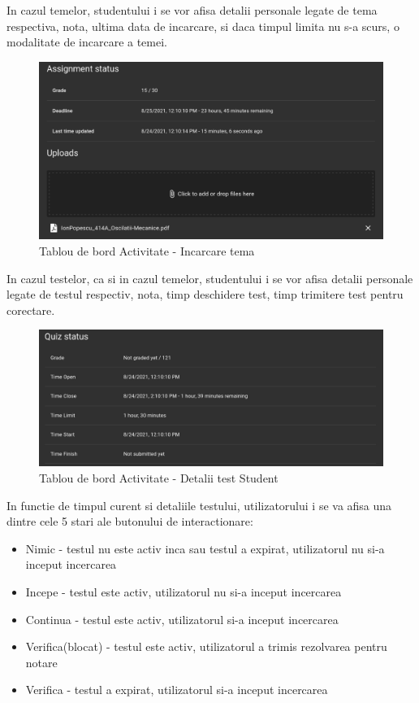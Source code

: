 \documentclass[12pt, a4paper, oneside, romanian]{teza-upb}
\begin{document}
In cazul temelor, studentului i se vor afisa detalii personale legate de tema respectiva, nota, ultima data de incarcare, si daca timpul limita nu s-a scurs, o modalitate de incarcare a temei.

\begin{figure}[H]
\centering
\includegraphics*[width=\columnwidth]{tablou-de-bord-activitate-incarcare-tema}
\caption{Tablou de bord Activitate - Incarcare tema}
\label{tablou-de-bord-activitate-incarcare-tema}
\end{figure}

In cazul testelor, ca si in cazul temelor, studentului i se vor afisa detalii personale legate de testul respectiv, nota, timp deschidere test, timp trimitere test pentru corectare.

\begin{figure}[H]
\centering
\includegraphics*[width=\columnwidth]{tablou-de-bord-activitate-detalii-test-student}
\caption{Tablou de bord Activitate - Detalii test Student}
\label{tablou-de-bord-activitate-detalii-test-student}
\end{figure}

In functie de timpul curent si detaliile testului, utilizatorului i se va afisa una dintre cele 5 stari ale butonului de interactionare:
\begin{itemize}
	\item Nimic - testul nu este activ inca sau testul a expirat, utilizatorul nu si-a inceput incercarea
	\item Incepe - testul este activ, utilizatorul nu si-a inceput incercarea
	\item Continua - testul este activ, utilizatorul si-a inceput incercarea
	\item Verifica(blocat) - testul este activ, utilizatorul a trimis rezolvarea pentru notare
	\item Verifica - testul a expirat, utilizatorul si-a inceput incercarea
\end{itemize}
\end{document}
